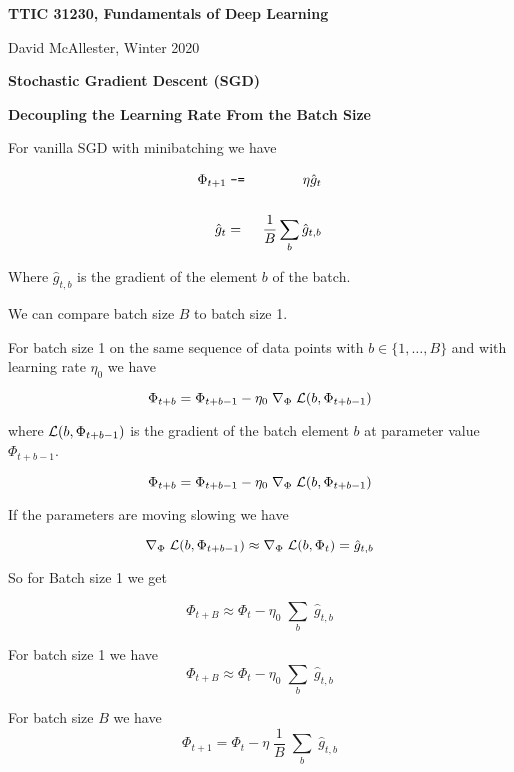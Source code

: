 


\newcommand{\solution}[1]{\bigskip {\bf Solution}: #1}



{\Huge
  \centerline{\bf TTIC 31230, Fundamentals of Deep Learning}
  \bigskip
  \centerline{David McAllester, Winter 2020}
  \vfill
  \centerline{\bf Stochastic Gradient Descent (SGD)}
  \vfill
  \centerline{\bf Decoupling the Learning Rate From the Batch Size}
  

For vanilla SGD with minibatching we have

\begin{eqnarray*}
\Phi_{t+1} & \;\mbox{\tt -=}\; & \eta \hat{g}_t \\
\\
\hat{g}_t & = & \frac{1}{B} \sum_b \hat{g}_{t,b}
\end{eqnarray*}

\vfill
Where $\hat{g}_{t,b}$ is the gradient of the element $b$ of the batch.


We can compare batch size $B$ to batch size 1.

\vfill
For batch size 1 on the same sequence of data points with $b \in \{1,\ldots,B\}$ and with learning rate $\eta_0$ we have

\vfill
$$\Phi_{t+b} = \Phi_{t+b-1} - \eta_0\;\nabla_\Phi\; {\cal L}(b,\Phi_{t+b-1})$$

\vfill
where ${\cal L}(b,\Phi_{t+b-1})$ is the gradient of the batch element $b$ at parameter value $\Phi_{t+b-1}$.


$$\Phi_{t+b} = \Phi_{t+b-1} - \eta_0\;\nabla_\Phi\; {\cal L}(b,\Phi_{t+b-1})$$

\vfill
If the parameters are moving slowing we have

\vfill
$$\nabla_\Phi \;{\cal L}(b,\Phi_{t+b-1}) \approx \nabla_\Phi \;{\cal L}(b,\Phi_{t}) = \hat{g}_{t,b}$$

\vfill
So for Batch size 1 we get

$$\Phi_{t+B} \approx \Phi_{t} - \eta_0\;\sum_b \;\hat{g}_{t,b}$$


For batch size 1 we have
$$\Phi_{t+B} \approx \Phi_{t} - \eta_0\;\sum_b \;\hat{g}_{t,b}$$

\vfill
For batch size $B$ we have
$$\Phi_{t+1} = \Phi_{t} - \eta\;\frac{1}{B}\;\sum_b \;\hat{g}_{t,b}$$

}
